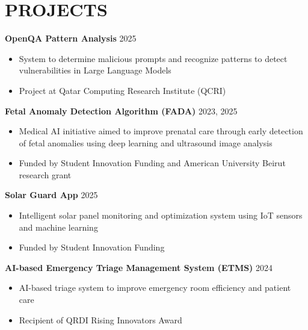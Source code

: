\documentclass[11pt,a4paper]{article}
\begin{document}
\newpage

\section*{PROJECTS}

\textbf{OpenQA Pattern Analysis} \hfill 2025
\begin{itemize}[leftmargin=2em, nosep, label={}]
    \item System to determine malicious prompts and recognize patterns to detect vulnerabilities in Large Language Models
    \item Project at Qatar Computing Research Institute (QCRI)
\end{itemize}

\vspace{4pt}

\textbf{Fetal Anomaly Detection Algorithm (FADA)} \hfill 2023, 2025
\begin{itemize}[leftmargin=2em, nosep, label={}]
    \item Medical AI initiative aimed to improve prenatal care through early detection of fetal anomalies using deep learning and ultrasound image analysis
    \item Funded by Student Innovation Funding and American University Beirut research grant
\end{itemize}

\vspace{4pt}

\textbf{Solar Guard App} \hfill 2025
\begin{itemize}[leftmargin=2em, nosep, label={}]
    \item Intelligent solar panel monitoring and optimization system using IoT sensors and machine learning
    \item Funded by Student Innovation Funding
\end{itemize}

\vspace{4pt}

\textbf{AI-based Emergency Triage Management System (ETMS)} \hfill 2024
\begin{itemize}[leftmargin=2em, nosep, label={}]
    \item AI-based triage system to improve emergency room efficiency and patient care
    \item Recipient of QRDI Rising Innovators Award
\end{itemize}

\end{document}
